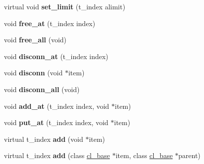 \begin{DoxyCompactItemize}
\item 
\hypertarget{classcl__list_ae233fbd20ae5ccdda7a0375eadb3b5d3}{
virtual void {\bfseries set\_\-limit} (t\_\-index alimit)}
\label{classcl__list_ae233fbd20ae5ccdda7a0375eadb3b5d3}

\item 
\hypertarget{classcl__list_ae738dd14c8f67f800d7c06bc723171f8}{
void {\bfseries free\_\-at} (t\_\-index index)}
\label{classcl__list_ae738dd14c8f67f800d7c06bc723171f8}

\item 
\hypertarget{classcl__list_ac992d70be5612e3a251d00ccae8db9b6}{
void {\bfseries free\_\-all} (void)}
\label{classcl__list_ac992d70be5612e3a251d00ccae8db9b6}

\item 
\hypertarget{classcl__list_a10444fbbd9e9379b055ccbdb0f1d48e7}{
void {\bfseries disconn\_\-at} (t\_\-index index)}
\label{classcl__list_a10444fbbd9e9379b055ccbdb0f1d48e7}

\item 
\hypertarget{classcl__list_a133204c93e910354549192660220225f}{
void {\bfseries disconn} (void $\ast$item)}
\label{classcl__list_a133204c93e910354549192660220225f}

\item 
\hypertarget{classcl__list_a0ae50538730bdca29fc2d4fbaf086274}{
void {\bfseries disconn\_\-all} (void)}
\label{classcl__list_a0ae50538730bdca29fc2d4fbaf086274}

\item 
\hypertarget{classcl__list_af29ad14994376973e07be4246d42043e}{
void {\bfseries add\_\-at} (t\_\-index index, void $\ast$item)}
\label{classcl__list_af29ad14994376973e07be4246d42043e}

\item 
\hypertarget{classcl__list_a49e7f12ec480a37415f4d7b84a6e4051}{
void {\bfseries put\_\-at} (t\_\-index index, void $\ast$item)}
\label{classcl__list_a49e7f12ec480a37415f4d7b84a6e4051}

\item 
\hypertarget{classcl__list_a562ab977d9cc496e10af548b06142f73}{
virtual t\_\-index {\bfseries add} (void $\ast$item)}
\label{classcl__list_a562ab977d9cc496e10af548b06142f73}

\item 
\hypertarget{classcl__list_a9fa74743220cae9203747bd719b243a6}{
virtual t\_\-index {\bfseries add} (class \hyperlink{classcl__base}{cl\_\-base} $\ast$item, class \hyperlink{classcl__base}{cl\_\-base} $\ast$parent)}
\label{classcl__list_a9fa74743220cae9203747bd719b243a6}


\end{DoxyCompactItemize}
